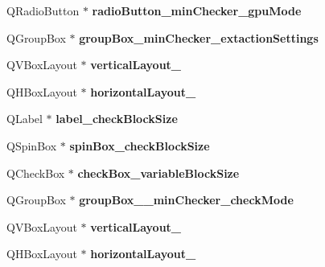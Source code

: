 \begin{DoxyCompactItemize}
\item 
\mbox{\label{class_ui___main_window_a9f3a3edaeac6538d03b03584decb8449}} 
Q\+Radio\+Button $\ast$ {\bfseries radio\+Button\+\_\+min\+Checker\+\_\+gpu\+Mode}
\item 
\mbox{\label{class_ui___main_window_a3bb24b55ac8037a8420b7dc479e8cb6d}} 
Q\+Group\+Box $\ast$ {\bfseries group\+Box\+\_\+min\+Checker\+\_\+extaction\+Settings}
\item 
\mbox{\label{class_ui___main_window_a6a019f3fa43181f4f848b92fd10fc783}} 
Q\+V\+Box\+Layout $\ast$ {\bfseries vertical\+Layout\+\_}
\item 
\mbox{\label{class_ui___main_window_a03ce63974cc69b067c91bbf285cceca8}} 
Q\+H\+Box\+Layout $\ast$ {\bfseries horizontal\+Layout\+\_}
\item 
\mbox{\label{class_ui___main_window_a725e092c04c4d19b316c13be51ff103b}} 
Q\+Label $\ast$ {\bfseries label\+\_\+check\+Block\+Size}
\item 
\mbox{\label{class_ui___main_window_a53c1cc8068ace95c13cc359be7274119}} 
Q\+Spin\+Box $\ast$ {\bfseries spin\+Box\+\_\+check\+Block\+Size}
\item 
\mbox{\label{class_ui___main_window_ae2ad3eeac582303dda2f2ac28d2b4149}} 
Q\+Check\+Box $\ast$ {\bfseries check\+Box\+\_\+variable\+Block\+Size}
\item 
\mbox{\label{class_ui___main_window_a451b24055e150cafbdef70433ca7b7de}} 
Q\+Group\+Box $\ast$ {\bfseries group\+Box\+\_\+\+\_\+min\+Checker\+\_\+check\+Mode}
\item 
\mbox{\label{class_ui___main_window_a9035970a95fa2f444cbf212b84e9d84f}} 
Q\+V\+Box\+Layout $\ast$ {\bfseries vertical\+Layout\+\_}
\item 
\mbox{\label{class_ui___main_window_af1a7bbeee705545b94c55c297299118d}} 
Q\+H\+Box\+Layout $\ast$ {\bfseries horizontal\+Layout\+\_}

\end{DoxyCompactItemize}
